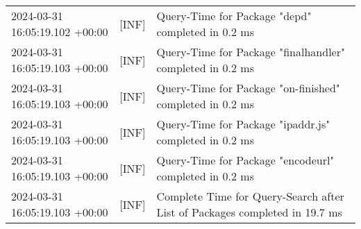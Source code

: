 {{\begin{tabularx}{\textwidth}{|l|l|X|}
                    2024-03-31 16:05:19.102 +00:00 & [INF] & Query-Time for Package "depd" completed in 0.2 ms \\
                    2024-03-31 16:05:19.103 +00:00 & [INF] & Query-Time for Package "finalhandler" completed in 0.2 ms \\
                    2024-03-31 16:05:19.103 +00:00 & [INF] & Query-Time for Package "on-finished" completed in 0.2 ms \\
                    2024-03-31 16:05:19.103 +00:00 & [INF] & Query-Time for Package "ipaddr.js" completed in 0.2 ms \\
                    2024-03-31 16:05:19.103 +00:00 & [INF] & Query-Time for Package "encodeurl" completed in 0.2 ms \\
                    2024-03-31 16:05:19.103 +00:00 & [INF] & Complete Time for Query-Search after List of Packages completed in 19.7 ms \\
                    \hline
                \end{tabularx}
            }
        }

